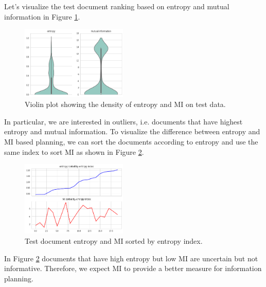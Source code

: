 Let's visualize the test document ranking based on entropy and mutual information in Figure \ref{fig:nb_info1}.
\begin{figure}[b]
    \centering
    \includegraphics[width=0.45\textwidth]{figures/nb_info1.png}
    \caption{Violin plot showing the density of entropy and MI on test data.}
    \label{fig:nb_info1}
\end{figure}
In particular, we are interested in outliers, i.e. documents that have highest entropy and mutual information. To visualize the difference between entropy and MI based planning, we can sort the documents according to entropy and use the same index to sort MI as shown in Figure \ref{fig:nb_info2}.
\begin{figure}[h]
    \centering
    \includegraphics[width=0.45\textwidth]{figures/nb_info2.png}
    \caption{Test document entropy and MI sorted by entropy index.}
    \label{fig:nb_info2}
\end{figure}
In Figure \ref{fig:nb_info2} documents that have high entropy but low MI are uncertain but not informative. Therefore, we expect MI to provide a better measure for information planning.

